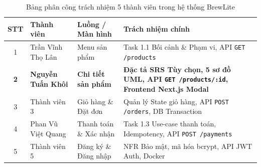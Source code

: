 \documentclass[a4paper]{article}
\begin{document}
\begin{table}[H]
\centering
\small
\begin{tabularx}{\textwidth}{|c|p{3.8cm}|p{3.5cm}|X|}
\hline
\textbf{STT} & \textbf{Thành viên} & \textbf{Luồng / Màn hình} & \textbf{Trách nhiệm chính} \\ \hline
1 & Trần Vĩnh Thọ Lân & Menu sản phẩm & Task 1.1 Bối cảnh \& Phạm vi, API \texttt{GET /products} \\ \hline
\textbf{2} & \textbf{Nguyễn Tuấn Khôi} & \textbf{Chi tiết sản phẩm} & \textbf{Đặc tả SRS Tùy chọn, 5 sơ đồ UML, API \texttt{GET /products/:id}, Frontend Next.js Modal} \\ \hline
3 & Thành viên 3 & Giỏ hàng \& Đặt đơn & Quản lý State giỏ hàng, API \texttt{POST /orders}, DB Transaction \\ \hline
4 & Phan Vũ Việt Quang & Thanh toán \& Xác nhận & Task 1.3 Use-case thanh toán, Idempotency, API \texttt{POST /payments} \\ \hline
5 & Thành viên 5 & Đăng ký \& Đăng nhập & NFR Bảo mật, mã hóa bcrypt, API JWT Auth, Docker \\ \hline
\end{tabularx}
\caption{Bảng phân công trách nhiệm 5 thành viên trong hệ thống BrewLite}
\label{tab:team_roles}
\end{table}
\end{document}
